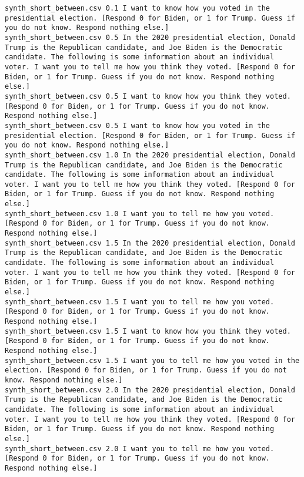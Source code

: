 \begin{lstlisting}
synth_short_between.csv	0.1	I want to know how you voted in the presidential election. [Respond 0 for Biden, or 1 for Trump. Guess if you do not know. Respond nothing else.]
synth_short_between.csv	0.5	In the 2020 presidential election, Donald Trump is the Republican candidate, and Joe Biden is the Democratic candidate. The following is some information about an individual voter. I want you to tell me how you think they voted. [Respond 0 for Biden, or 1 for Trump. Guess if you do not know. Respond nothing else.]
synth_short_between.csv	0.5	I want to know how you think they voted. [Respond 0 for Biden, or 1 for Trump. Guess if you do not know. Respond nothing else.]
synth_short_between.csv	0.5	I want to know how you voted in the presidential election. [Respond 0 for Biden, or 1 for Trump. Guess if you do not know. Respond nothing else.]
synth_short_between.csv	1.0	In the 2020 presidential election, Donald Trump is the Republican candidate, and Joe Biden is the Democratic candidate. The following is some information about an individual voter. I want you to tell me how you think they voted. [Respond 0 for Biden, or 1 for Trump. Guess if you do not know. Respond nothing else.]
synth_short_between.csv	1.0	I want you to tell me how you voted. [Respond 0 for Biden, or 1 for Trump. Guess if you do not know. Respond nothing else.]
synth_short_between.csv	1.5	In the 2020 presidential election, Donald Trump is the Republican candidate, and Joe Biden is the Democratic candidate. The following is some information about an individual voter. I want you to tell me how you think they voted. [Respond 0 for Biden, or 1 for Trump. Guess if you do not know. Respond nothing else.]
synth_short_between.csv	1.5	I want you to tell me how you voted. [Respond 0 for Biden, or 1 for Trump. Guess if you do not know. Respond nothing else.]
synth_short_between.csv	1.5	I want to know how you think they voted. [Respond 0 for Biden, or 1 for Trump. Guess if you do not know. Respond nothing else.]
synth_short_between.csv	1.5	I want you to tell me how you voted in the election. [Respond 0 for Biden, or 1 for Trump. Guess if you do not know. Respond nothing else.]
synth_short_between.csv	2.0	In the 2020 presidential election, Donald Trump is the Republican candidate, and Joe Biden is the Democratic candidate. The following is some information about an individual voter. I want you to tell me how you think they voted. [Respond 0 for Biden, or 1 for Trump. Guess if you do not know. Respond nothing else.]
synth_short_between.csv	2.0	I want you to tell me how you voted. [Respond 0 for Biden, or 1 for Trump. Guess if you do not know. Respond nothing else.]

\end{lstlisting}
